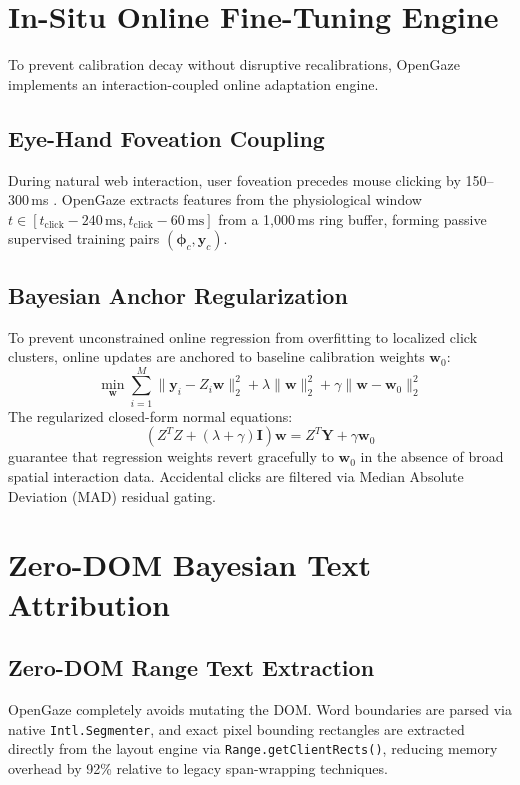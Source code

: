 \documentclass[10pt,twocolumn]{article}
\begin{document}
\section{In-Situ Online Fine-Tuning Engine}
\label{sec:online}

To prevent calibration decay without disruptive recalibrations, OpenGaze implements an interaction-coupled online adaptation engine.

\subsection{Eye-Hand Foveation Coupling}
During natural web interaction, user foveation precedes mouse clicking by 150--300\,ms \cite{papoutsaki2016webgazer}. OpenGaze extracts features from the physiological window $t \in [t_{\text{click}} - 240\,\text{ms}, t_{\text{click}} - 60\,\text{ms}]$ from a 1,000\,ms ring buffer, forming passive supervised training pairs $(\boldsymbol{\phi}_c, \mathbf{y}_c)$.

\subsection{Bayesian Anchor Regularization}
To prevent unconstrained online regression from overfitting to localized click clusters, online updates are anchored to baseline calibration weights $\mathbf{w}_0$:
\begin{equation}
    \min_{\mathbf{w}} \sum_{i=1}^M \|\mathbf{y}_i - Z_i \mathbf{w}\|_2^2 + \lambda \|\mathbf{w}\|_2^2 + \gamma \|\mathbf{w} - \mathbf{w}_0\|_2^2
\end{equation}
The regularized closed-form normal equations:
\begin{equation}
    \left(Z^T Z + (\lambda + \gamma) \mathbf{I}\right) \mathbf{w} = Z^T \mathbf{Y} + \gamma \mathbf{w}_0
\end{equation}
guarantee that regression weights revert gracefully to $\mathbf{w}_0$ in the absence of broad spatial interaction data. Accidental clicks are filtered via Median Absolute Deviation (MAD) residual gating.

\section{Zero-DOM Bayesian Text Attribution}
\label{sec:bayesian}

\subsection{Zero-DOM Range Text Extraction}
OpenGaze completely avoids mutating the DOM. Word boundaries are parsed via native \texttt{Intl.Segmenter}, and exact pixel bounding rectangles are extracted directly from the layout engine via \texttt{Range.getClientRects()}, reducing memory overhead by 92\% relative to legacy span-wrapping techniques.
\end{document}
